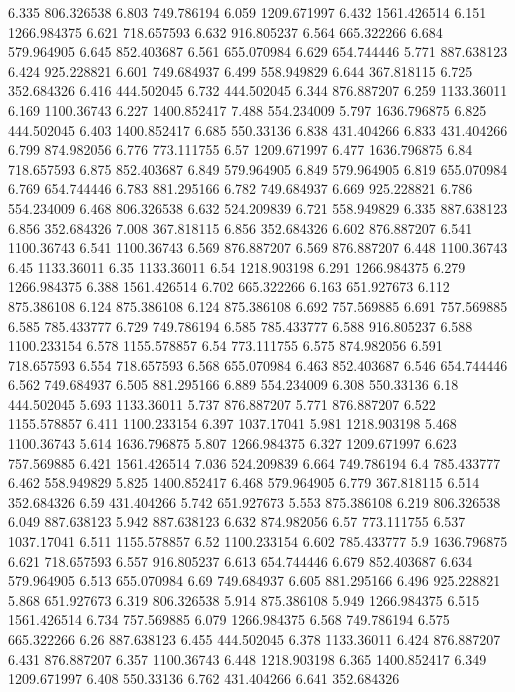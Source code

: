 6.335	806.326538
6.803	749.786194
6.059	1209.671997
6.432	1561.426514
6.151	1266.984375
6.621	718.657593
6.632	916.805237
6.564	665.322266
6.684	579.964905
6.645	852.403687
6.561	655.070984
6.629	654.744446
5.771	887.638123
6.424	925.228821
6.601	749.684937
6.499	558.949829
6.644	367.818115
6.725	352.684326
6.416	444.502045
6.732	444.502045
6.344	876.887207
6.259	1133.36011
6.169	1100.36743
6.227	1400.852417
7.488	554.234009
5.797	1636.796875
6.825	444.502045
6.403	1400.852417
6.685	550.33136
6.838	431.404266
6.833	431.404266
6.799	874.982056
6.776	773.111755
6.57	1209.671997
6.477	1636.796875
6.84	718.657593
6.875	852.403687
6.849	579.964905
6.849	579.964905
6.819	655.070984
6.769	654.744446
6.783	881.295166
6.782	749.684937
6.669	925.228821
6.786	554.234009
6.468	806.326538
6.632	524.209839
6.721	558.949829
6.335	887.638123
6.856	352.684326
7.008	367.818115
6.856	352.684326
6.602	876.887207
6.541	1100.36743
6.541	1100.36743
6.569	876.887207
6.569	876.887207
6.448	1100.36743
6.45	1133.36011
6.35	1133.36011
6.54	1218.903198
6.291	1266.984375
6.279	1266.984375
6.388	1561.426514
6.702	665.322266
6.163	651.927673
6.112	875.386108
6.124	875.386108
6.124	875.386108
6.692	757.569885
6.691	757.569885
6.585	785.433777
6.729	749.786194
6.585	785.433777
6.588	916.805237
6.588	1100.233154
6.578	1155.578857
6.54	773.111755
6.575	874.982056
6.591	718.657593
6.554	718.657593
6.568	655.070984
6.463	852.403687
6.546	654.744446
6.562	749.684937
6.505	881.295166
6.889	554.234009
6.308	550.33136
6.18	444.502045
5.693	1133.36011
5.737	876.887207
5.771	876.887207
6.522	1155.578857
6.411	1100.233154
6.397	1037.17041
5.981	1218.903198
5.468	1100.36743
5.614	1636.796875
5.807	1266.984375
6.327	1209.671997
6.623	757.569885
6.421	1561.426514
7.036	524.209839
6.664	749.786194
6.4	785.433777
6.462	558.949829
5.825	1400.852417
6.468	579.964905
6.779	367.818115
6.514	352.684326
6.59	431.404266
5.742	651.927673
5.553	875.386108
6.219	806.326538
6.049	887.638123
5.942	887.638123
6.632	874.982056
6.57	773.111755
6.537	1037.17041
6.511	1155.578857
6.52	1100.233154
6.602	785.433777
5.9	1636.796875
6.621	718.657593
6.557	916.805237
6.613	654.744446
6.679	852.403687
6.634	579.964905
6.513	655.070984
6.69	749.684937
6.605	881.295166
6.496	925.228821
5.868	651.927673
6.319	806.326538
5.914	875.386108
5.949	1266.984375
6.515	1561.426514
6.734	757.569885
6.079	1266.984375
6.568	749.786194
6.575	665.322266
6.26	887.638123
6.455	444.502045
6.378	1133.36011
6.424	876.887207
6.431	876.887207
6.357	1100.36743
6.448	1218.903198
6.365	1400.852417
6.349	1209.671997
6.408	550.33136
6.762	431.404266
6.641	352.684326
